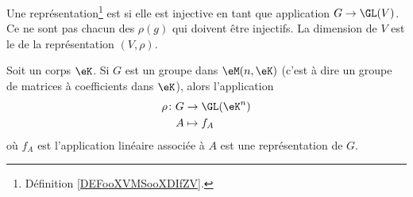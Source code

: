 \begin{definition}
    Une représentation\footnote{Définition \ref{DEFooXVMSooXDIfZV}.} est  si elle est injective en tant que application \( G\to \GL(V)\). Ce ne sont pas chacun des \( \rho(g)\) qui doivent être injectifs. La dimension de \( V\) est le  de la représentation \( (V,\rho)\).
\end{definition}

\begin{proposition}     \label{PROPooHNQOooSzeEFG}
    Soit un corps \( \eK\). Si \( G\) est un groupe dans \( \eM(n,\eK)\) (c'est à dire un groupe de matrices à coefficients dans \( \eK\)), alors l'application
    \begin{equation}
        \begin{aligned}
                \rho\colon G&\to \GL(\eK^n) \\
            A&\mapsto f_A 
        \end{aligned}
    \end{equation}
    où \( f_A\) est l'application linéaire associée à \( A\) est une représentation de \( G\).
\end{proposition}



